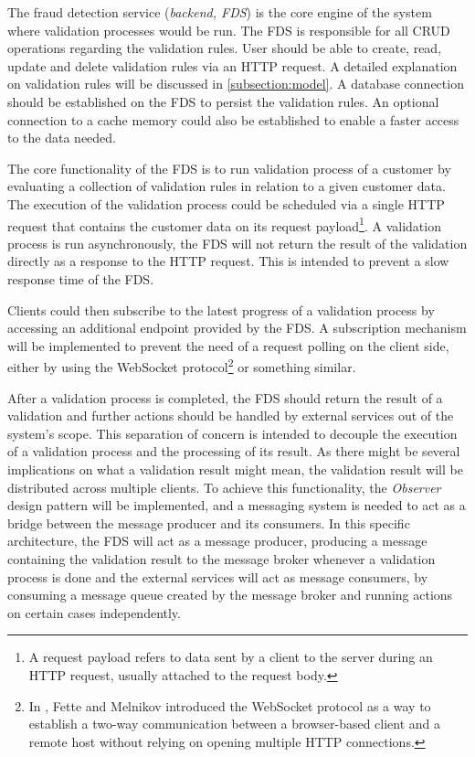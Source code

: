 The fraud detection service (\emph{backend, FDS}) is the core engine of the system where validation processes would be run. The FDS is responsible for all CRUD operations regarding the validation rules. User should be able to create, read, update and delete validation rules via an HTTP request. A detailed explanation on validation rules will be discussed in \autoref{subsection:model}. A database connection should be established on the FDS to persist the validation rules. An optional connection to a cache memory could also be established to enable a faster access to the data needed.

The core functionality of the FDS is to run validation process of a customer by evaluating a collection of validation rules in relation to a given customer data. The execution of the validation process could be scheduled via a single HTTP request that contains the customer data on its request payload\footnote{A request payload refers to data sent by a client to the server during an HTTP request, usually attached to the request body\autocite[\enquote{4.3 Message Body}]{http-rfc}.}. A validation process is run asynchronously, the FDS will not return the result of the validation directly as a response to the HTTP request. This is intended to prevent a slow response time of the FDS. 

Clients could then subscribe to the latest progress of a validation process by accessing an additional endpoint provided by the FDS. A subscription mechanism will be implemented to prevent the need of a request polling on the client side, either by using the WebSocket protocol\footnote{In \autocite{rfc6455}, Fette and Melnikov introduced the WebSocket protocol as a way to establish a two-way communication between a browser-based client and a remote host without relying on opening multiple HTTP connections.} or something similar. 

After a validation process is completed, the FDS should return the result of a validation and further actions should be handled by external services out of the system's scope. This separation of concern is intended to decouple the execution of a validation process and the processing of its result. As there might be several implications on what a validation result might mean, the validation result will be distributed across multiple clients. To achieve this functionality, the \emph{Observer} \autocite[pp. 293-303]{gamma-1995} design pattern will be implemented, and a messaging system is needed to act as a bridge between the message producer and its consumers. In this specific architecture, the FDS will act as a message producer, producing a message containing the validation result to the message broker whenever a validation process is done and the external services will act as message consumers, by consuming a message queue created by the message broker and running actions on certain cases independently.